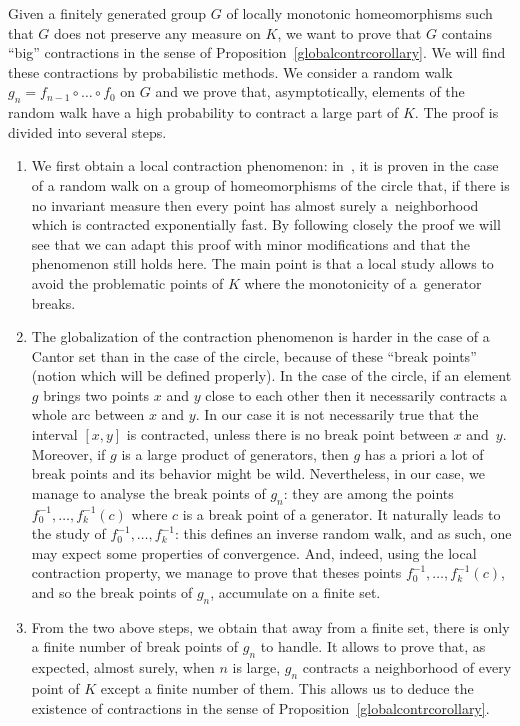 \documentclass[10pt]{amsart}
\theoremstyle{definition}\newtheorem{defi}[theo]{Definition}\newtheorem{rema}[theo]{Remark}\newtheorem{exam}[theo]{Example}\newtheorem{exem}[theo]{Example}\newtheorem{nota}[theo]{Notation}
\newcounter{setofcase}
\newcounter{case}[setofcase]
\begin{document}
Given a finitely generated group $G$ of locally monotonic homeomorphisms such that $G$ does not preserve any measure on $K$, we want to prove that $G$ contains ``big'' contractions in the sense of Proposition~\ref{globalcontrcorollary}. We will find these contractions by probabilistic methods. We consider a random walk $g_n=f_{n-1}\circ\dots\circ f_0$ on $G$ and we prove that, asymptotically, elements of the random walk have a high probability to contract a large part of $K$. The proof is divided into several steps.
\begin{enumerate}
\item We first obtain a local contraction phenomenon: in~\cite{Mal}, it is proven in the case of a random walk on a group of homeomorphisms of the circle that, if there is no invariant measure then every point has almost surely a~neighborhood which is contracted exponentially fast. By following closely the proof we will see that we can adapt this proof with minor modifications and that the phenomenon still holds here. The main point is that a local study allows to avoid the problematic points of $K$ where the monotonicity of a~generator breaks.

\item The globalization of the contraction phenomenon is harder in the case of a Cantor set than in the case of the circle, because of these ``break points'' (notion which will be defined properly). In the case of the circle, if an element $g$ brings two points $x$ and $y$ close to each other then it necessarily contracts a whole arc between $x$ and $y$. In our case it is not necessarily true that the interval $[x,y]$ is contracted, unless there is no break point between $x$ and~$y$. Moreover, if $g$ is a large product of generators, then $g$ has a priori a lot of break points and its behavior might be wild. Nevertheless, in our case, we manage to analyse the break points of $g_n$: they are among the points $f_0^{-1},\dots, f_k^{-1}(c)$ where $c$ is a break point of a generator. It naturally leads to the study of $f_0^{-1},\dots,f_k^{-1}$: this defines an inverse random walk, and as such, one may expect some properties of convergence. And, indeed, using the local contraction property, we manage to prove that theses points $f_0^{-1},\dots,f_k^{-1}(c)$, and so the break points of $g_n$, accumulate on a finite set.

\item From the two above steps, we obtain that away from a finite set, there is only a finite number of break points of $g_n$ to handle. It allows to prove that, as expected, almost surely, when $n$ is large, $g_n$ contracts a neighborhood of every point of $K$ except a finite number of them. This allows us to deduce the existence of contractions in the sense of Proposition~\ref{globalcontrcorollary}.
\end{enumerate}
\end{document}
